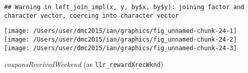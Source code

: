 \documentclass[10pt]{report}
\newenvironment{Shaded}{}{}
\newcommand{\KeywordTok}[1]{\textcolor[rgb]{0.00,0.44,0.13}{\textbf{{#1}}}}
\newcommand{\DataTypeTok}[1]{\textcolor[rgb]{0.56,0.13,0.00}{{#1}}}
\newcommand{\StringTok}[1]{\textcolor[rgb]{0.25,0.44,0.63}{{#1}}}
\newcommand{\NormalTok}[1]{{#1}}
\begin{document}
\begin{Shaded}
\end{Shaded}

\begin{verbatim}
## Warning in left_join_impl(x, y, by$x, by$y): joining factor and character vector, coercing into character vector
\end{verbatim}

\begin{Shaded}
\end{Shaded}

\begin{center}\texttt{[image: /Users/user/dmc2015/ian/graphics/fig\_unnamed-chunk-24-1]} \texttt{[image: /Users/user/dmc2015/ian/graphics/fig\_unnamed-chunk-24-2]} \texttt{[image: /Users/user/dmc2015/ian/graphics/fig\_unnamed-chunk-24-3]} \end{center}

\emph{couponsReceivedWeekend} (as \texttt{llr\_rewardXrecWknd})
\end{document}
